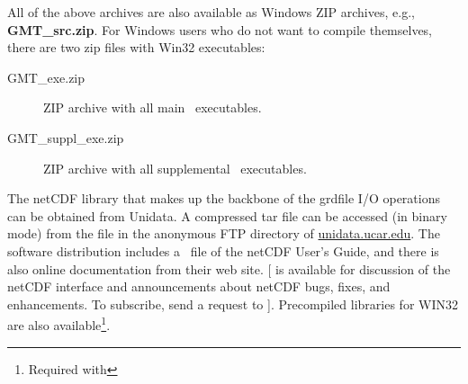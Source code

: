 
All of the above archives are also available as Windows ZIP archives, e.g., {\bf GMT\_src.zip}.
For Windows users who do not want to compile themselves, there are two zip files with Win32 executables:

\begin{description}

\item[GMT\_exe.zip] ZIP archive with all main \GMT\ executables.

\item[GMT\_suppl\_exe.zip] ZIP archive with all supplemental \GMT\ executables.

\end{description}


The netCDF library that makes up the backbone of the grdfile
I/O operations can be obtained from  Unidata.  A compressed
tar file can be accessed (in binary mode) from the file
 in the anonymous FTP directory of
\underline{unidata.ucar.edu}.
The software distribution includes a \PS\ file of
the netCDF User's Guide, and there is also online documentation
from their web site.  [
is available for discussion of the netCDF interface and
announcements about netCDF bugs, fixes, and enhancements.  To
subscribe, send a request to
].
Precompiled libraries for WIN32 are also available\footnote{Required
with }.
